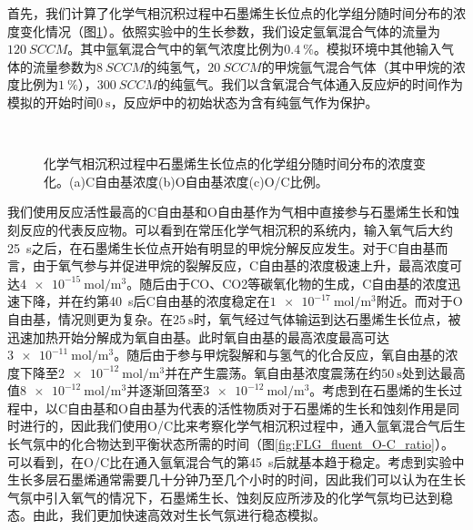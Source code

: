 首先，我们计算了化学气相沉积过程中石墨烯生长位点的化学组分随时间分布的浓度变化情况（图\ref{fig:FLG_fluent}）。依照实验中的生长参数，我们设定氩氧混合气体的流量为$\SI{120}{SCCM}$。其中氩氧混合气中的氧气浓度比例为$\SI{0.4}{\percent}$。模拟环境中其他输入气体的流量参数为$\SI{8}{SCCM}$的纯氢气，$\SI{20}{SCCM}$的甲烷氩气混合气体（其中甲烷的浓度比例为$\SI{1}{\percent}$），$\SI{300}{SCCM}$的纯氩气。我们以含氧混合气体通入反应炉的时间作为模拟的开始时间$\SI{0}{\second}$，反应炉中的初始状态为含有纯氩气作为保护。

\begin{figure}[htb]
    \centering
    \\[-0.5ex]
    \caption{化学气相沉积过程中石墨烯生长位点的化学组分随时间分布的浓度变化。(a)C自由基浓度(b)O自由基浓度(c)O/C比例。
    }
    \label{fig:FLG_fluent}
\end{figure}

我们使用反应活性最高的C自由基和O自由基作为气相中直接参与石墨烯生长和蚀刻反应的代表反应物。可以看到在常压化学气相沉积的系统内，输入氧气后大约\SI{25}{\second}之后，在石墨烯生长位点开始有明显的甲烷分解反应发生。对于C自由基而言，由于氧气参与并促进甲烷的裂解反应，C自由基的浓度极速上升，最高浓度可达$\SI{4e-15}{\mole\per\cubic\metre}$。随后由于CO、CO2等碳氧化物的生成，C自由基的浓度迅速下降，并在约第\SI{40}{\second}后C自由基的浓度稳定在$\SI{1e-17}{\mole\per\cubic\metre}$附近。而对于O自由基，情况则更为复杂。在$\SI{25}{\second}$时，氧气经过气体输运到达石墨烯生长位点，被迅速加热开始分解成为氧自由基。此时氧自由基的最高浓度最高可达$\SI{3e-11}{\mole\per\cubic\metre}$。随后由于参与甲烷裂解和与氢气的化合反应，氧自由基的浓度下降至$\SI{2e-12}{\mole\per\cubic\metre}$并在产生震荡。氧自由基浓度震荡在约$\SI{50}{\second}$处到达最高值$\SI{8e-12}{\mole\per\cubic\metre}$并逐渐回落至$\SI{3e-12}{\mole\per\cubic\metre}$。考虑到在石墨烯的生长过程中，以C自由基和O自由基为代表的活性物质对于石墨烯的生长和蚀刻作用是同时进行的，因此我们使用O/C比来考察化学气相沉积过程中，通入氩氧混合气后生长气氛中的化合物达到平衡状态所需的时间（图\ref{fig:FLG_fluent_O-C_ratio}）。可以看到，在O/C比在通入氩氧混合气的第\SI{45}{\second}后就基本趋于稳定。考虑到实验中生长多层石墨烯通常需要几十分钟乃至几个小时的时间，因此我们可以认为在生长气氛中引入氧气的情况下，石墨烯生长、蚀刻反应所涉及的化学气氛均已达到稳态。由此，我们更加快速高效对生长气氛进行稳态模拟。

